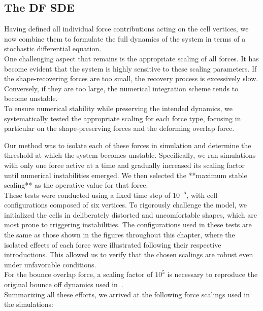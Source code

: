 \subsection{The DF SDE}
Having defined all individual force contributions acting on the cell vertices, we now combine them to formulate the full dynamics of the system in terms of a stochastic differential equation. \\
One challenging aspect that remains is the appropriate scaling of all forces.
It has become evident that the system is highly sensitive to these scaling parameters. 
If the shape-recovering forces are too small, the recovery process is excessively slow. 
Conversely, if they are too large, the numerical integration scheme tends to become unstable. \\ 
To ensure numerical stability while preserving the intended dynamics, we systematically tested the appropriate scaling for each force type, focusing in particular on the shape-preserving forces and the deforming overlap force.

Our method was to isolate each of these forces in simulation and determine the threshold at which the system becomes unstable. 
Specifically, we ran simulations with only one force active at a time and gradually increased its scaling factor until numerical instabilities emerged. 
We then selected the **maximum stable scaling** as the operative value for that force. \\
These tests were conducted using a fixed time step of $10^{-5}$, with cell configurations composed of six vertices. 
To rigorously challenge the model, we initialized the cells in deliberately distorted and uncomfortable shapes, which are most prone to triggering instabilities. 
The configurations used in these tests are the same as those shown in the figures throughout this chapter, where the isolated effects of each force were illustrated following their respective introductions. 
This allowed us to verify that the chosen scalings are robust even under unfavorable conditions. \\
For the bounce overlap force, a scaling factor of $10^5$ is necessary to reproduce the original bounce off dynamics used in~\cite{Bruna2012}. \\
Summarizing all these efforts, we arrived at the following force scalings used in the simulations:

